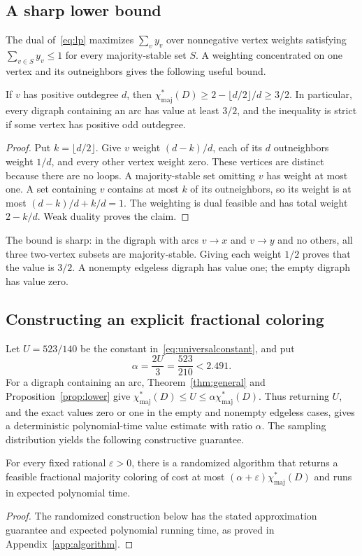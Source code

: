 \documentclass[12pt]{article}
\newcommand{\chif}{\chi^*_{\mathrm{maj}}}
\newcommand{\floor}[1]{\lfloor #1\rfloor}
\begin{document}
\subsection{A sharp lower bound}
The dual of~\eqref{eq:lp} maximizes \(\sum_v y_v\) over nonnegative vertex weights satisfying \(\sum_{v\in S}y_v\le1\) for every majority-stable set \(S\). A weighting concentrated on one vertex and its outneighbors gives the following useful bound.
\begin{proposition}\label{prop:lower}
If \(v\) has positive outdegree \(d\), then \(\chif(D)\ge2-\floor{d/2}/d\ge3/2\). In particular, every digraph containing an arc has value at least \(3/2\), and the inequality is strict if some vertex has positive odd outdegree.
\end{proposition}
\begin{proof}
Put \(k=\floor{d/2}\). Give \(v\) weight \((d-k)/d\), each of its \(d\) outneighbors weight \(1/d\), and every other vertex weight zero. These vertices are distinct because there are no loops. A majority-stable set omitting \(v\) has weight at most one. A set containing \(v\) contains at most \(k\) of its outneighbors, so its weight is at most \((d-k)/d+k/d=1\). The weighting is dual feasible and has total weight \(2-k/d\). Weak duality proves the claim.
\end{proof}
The bound is sharp: in the digraph with arcs \(v\to x\) and \(v\to y\) and no others, all three two-vertex subsets are majority-stable. Giving each weight \(1/2\) proves that the value is \(3/2\). A nonempty edgeless digraph has value one; the empty digraph has value zero.

\subsection{Constructing an explicit fractional coloring}\label{sec:positiveapprox}
Let \(U=523/140\) be the constant in~\eqref{eq:universalconstant}, and put
\begin{equation}\label{eq:approxratio}
\alpha=\frac{2U}{3}=\frac{523}{210}<2.491.
\end{equation}
For a digraph containing an arc, Theorem~\ref{thm:general} and Proposition~\ref{prop:lower} give \(\chif(D)\le U\le\alpha\chif(D)\). Thus returning \(U\), and the exact values zero or one in the empty and nonempty edgeless cases, gives a deterministic polynomial-time value estimate with ratio \(\alpha\). The sampling distribution yields the following constructive guarantee.
\begin{corollary}\label{cor:valueapprox}
For every fixed rational $\varepsilon>0$, there is a randomized algorithm that returns a feasible fractional majority coloring of cost at most $(\alpha+\varepsilon)\chif(D)$ and runs in expected polynomial time.
\end{corollary}
\begin{proof}
The randomized construction below has the stated approximation guarantee and expected polynomial running time, as proved in Appendix~\ref{app:algorithm}.
\end{proof}
\end{document}
